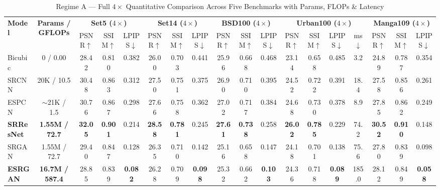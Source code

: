 \documentclass[10pt,onecolumn,journal]{IEEEtran}
\begin{document}
\begin{table}[t]
\centering
\caption{Regime A --- Full $4\times$ Quantitative Comparison Across Five Benchmarks with Params, FLOPs \& Latency}
\label{tab:regime_a}
\scriptsize
\setlength{\tabcolsep}{3.5pt}
\begin{tabular}{@{}lc|ccc|ccc|ccc|cccc|ccc@{}}
\toprule
\multirow{2}{*}{\textbf{Model}} & \multirow{2}{*}{\textbf{Params / GFLOPs}} & \multicolumn{3}{c|}{\textbf{Set5 ($4\times$)}} & \multicolumn{3}{c|}{\textbf{Set14 ($4\times$)}} & \multicolumn{3}{c|}{\textbf{BSD100 ($4\times$)}} & \multicolumn{4}{c|}{\textbf{Urban100 ($4\times$)}} & \multicolumn{3}{c}{\textbf{Manga109 ($4\times$)}} \\
& & PSNR$\uparrow$ & SSIM$\uparrow$ & LPIPS$\downarrow$ & PSNR$\uparrow$ & SSIM$\uparrow$ & LPIPS$\downarrow$ & PSNR$\uparrow$ & SSIM$\uparrow$ & LPIPS$\downarrow$ & PSNR$\uparrow$ & SSIM$\uparrow$ & LPIPS$\downarrow$ & ms$\downarrow$ & PSNR$\uparrow$ & SSIM$\uparrow$ & LPIPS$\downarrow$ \\
\midrule
Bicubic~\cite{keys1981cubic} & $0$ / $0.00$ & 28.42 & 0.810 & 0.382 & 26.00 & 0.703 & 0.441 & 25.96 & 0.668 & 0.468 & 23.14 & 0.658 & 0.485 & 3.2 & 24.89 & 0.787 & 0.354 \\
SRCNN~\cite{dong2016srcnn} & 20K / 10.5 & 30.48 & 0.863 & 0.312 & 27.50 & 0.751 & 0.375 & 26.90 & 0.710 & 0.395 & 24.52 & 0.722 & 0.391 & 18.4 & 27.58 & 0.856 & 0.261 \\
ESPCN~\cite{shi2016espcn} & $\sim$21K / 1.5 & 30.76 & 0.867 & 0.298 & 27.66 & 0.758 & 0.362 & 27.02 & 0.717 & 0.384 & 24.68 & 0.730 & 0.378 & 8.9 & 27.85 & 0.862 & 0.249 \\
\textbf{SRResNet}~\cite{ledig2017srgan} & \textbf{1.55M / 72.7} & \textbf{32.05} & \textbf{0.901} & 0.214 & \textbf{28.58} & \textbf{0.781} & 0.245 & \textbf{27.61} & \textbf{0.738} & 0.258 & \textbf{26.02} & \textbf{0.785} & 0.229 & 74.2 & \textbf{30.52} & \textbf{0.910} & 0.148 \\
SRGAN~\cite{ledig2017srgan} & 1.55M / 72.7 & 29.40 & 0.847 & 0.128 & 26.35 & 0.710 & 0.142 & 25.16 & 0.658 & 0.147 & 24.18 & 0.701 & 0.138 & 75.6 & 27.80 & 0.839 & 0.098 \\
\textbf{ESRGAN}~\cite{wang2018esrgan} & \textbf{16.7M / 587.4} & 28.85 & 0.839 & \textbf{0.082} & 26.28 & 0.709 & \textbf{0.098} & 25.32 & 0.662 & \textbf{0.103} & 24.36 & 0.718 & \textbf{0.089} & 185.0 & 28.12 & 0.849 & \textbf{0.058} \\
\bottomrule
\end{tabular}
\end{table}
\end{document}
